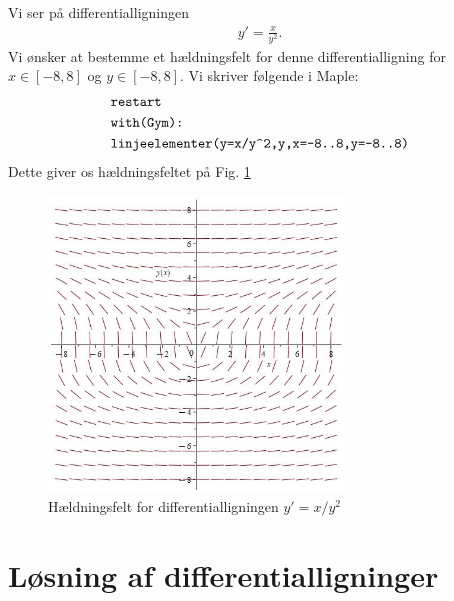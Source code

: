 \begin{exa}
	Vi ser på differentialligningen
	\begin{align*}
		y' = \frac{x}{y^2}.
	\end{align*}
	Vi ønsker at bestemme et hældningsfelt for denne differentialligning for $x\in [-8,8]$ og $y\in [-8,8]$. Vi skriver følgende i Maple:
	\begin{align*}
		&\texttt{restart}\\
		&\texttt{with(Gym):}\\
		&\texttt{linjeelementer(y=x/y\string^2,y,x=-8..8,y=-8..8)}
	\end{align*}
	Dette giver os hældningsfeltet på Fig. \ref{fig:heldning}
	\begin{figure}[H]
		\center		
		\includegraphics[width=0.7\textwidth]{Billeder/linjeelement.jpg}
		\caption{Hældningsfelt for differentialligningen $y' =x/y^2$}
		\label{fig:heldning}
	\end{figure}
\end{exa}

\section*{Løsning af differentialligninger}

